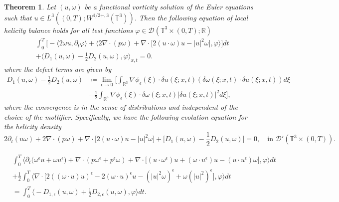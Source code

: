 \documentclass[10pt,a4paper]{amsart}
\newtheorem{theorem}{Theorem}
\begin{document}
\begin{theorem} \label{helicitybalance}
Let $(u,\omega)$ be a functional vorticity solution of the Euler equations such that $u \in L^3 ((0,T); W^{1/2+,3} (\mathbb{T}^3))$. Then the following equation of local helicity balance holds for all test functions $\varphi \in \mathcal{D} (\mathbb{T}^3 \times (0,T); \mathbb{R})$
\begin{align}
&\int_0^T \bigg[ - \bigg\langle 2 \omega u, \partial_t \varphi \bigg\rangle + \bigg\langle  2 \nabla \cdot (p \omega) + \nabla \cdot \big[ 2 (u \cdot \omega) u - \lvert u \rvert^2 \omega \big], \varphi \bigg\rangle \bigg] dt \nonumber \\
&+ \bigg\langle D_{1} (u, \omega) - \frac{1}{2} D_{2} (u, \omega) ,  \varphi \bigg\rangle_{x,t} = 0. \label{localhelicitybalance}
\end{align}
where the defect terms are given by
\begin{align}
D_1 (u,\omega) - \frac{1}{2} D_2 (u, \omega) &\coloneqq \lim_{\epsilon \rightarrow 0} \bigg[\int_{\mathbb{R}^3} \nabla \phi_\epsilon (\xi) \cdot \delta u (\xi ; x,t) (\delta \omega (\xi ;x,t) \cdot \delta u (\xi ; x, t) ) d \xi \nonumber \\
&- \frac{1}{2} \int_{\mathbb{R}^3} \nabla \phi_\epsilon (\xi) \cdot \delta \omega (\xi ; x,t) \lvert \delta u (\xi ;x,t) \rvert^2 d \xi \bigg],
\end{align}
where the convergence is in the sense of distributions and independent of the choice of the mollifier. Specifically, we have the following evolution equation for the helicity density
\begin{equation}
2 \partial_t (u \omega) + 2 \nabla \cdot (p \omega) + \nabla \cdot \big[2 (u \cdot \omega) u - \lvert u \rvert^2 \omega \big] + \bigg[ D_1 (u,\omega) - \frac{1}{2} D_2 (u, \omega) \bigg] = 0, \quad \text{in } \mathcal{D}' (\mathbb{T}^3 \times (0,T)).
\end{equation}
\end{theorem}

\begin{align}
&\int_0^T \bigg\langle \partial_t \big( \omega^\epsilon u + \omega u^\epsilon \big) + \nabla \cdot (p \omega^\epsilon + p^\epsilon \omega) + \nabla \cdot \big[ (u \cdot \omega^\epsilon) u + (\omega \cdot u^\epsilon) u - (u \cdot u^\epsilon) \omega \big], \varphi \bigg\rangle dt \nonumber \\
&+ \frac{1}{2} \int_0^T \bigg\langle \nabla \cdot \big[ 2((\omega \cdot u) u)^\epsilon - 2(\omega \cdot u)^\epsilon u - ( \lvert u \rvert^2 \omega)^\epsilon + \omega (\lvert u \rvert^2)^\epsilon \big], \varphi \bigg\rangle dt \nonumber \\
&= \int_0^T \bigg\langle - D_{1,\epsilon} (u, \omega) + \frac{1}{2} D_{2,\epsilon} (u, \omega) ,  \varphi \bigg\rangle dt. \label{mollifiedbalance}
\end{align}
\end{document}
